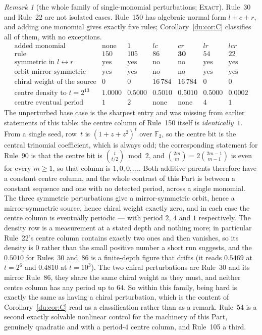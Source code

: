 \documentclass[11pt]{article}
\theoremstyle{definition}
\theoremstyle{remark}
\newtheorem{remark}[theorem]{Remark}
\newcommand{\F}{\mathbb{F}_2}
\newcommand{\EXACT}{\textsc{Exact}}
\begin{document}
\begin{remark}[the whole family of single-monomial perturbations; \EXACT]\label{du:family}
Rule~30 and Rule~22 are not isolated cases. Rule~150 has algebraic normal form $l+c+r$, and adding one
monomial gives exactly five rules; Corollary~\ref{du:cor:C} classifies all of them, with no exceptions.
\[
\begin{array}{lcccccc}
\text{added monomial} & \text{none} & 1 & lc & cr & lr & lcr\\
\text{rule} & 150 & 105 & 86 & \mathbf{30} & 54 & 22\\
\text{symmetric in } l\leftrightarrow r & \text{yes} & \text{yes} & \text{no} & \text{no} & \text{yes} & \text{yes}\\
\text{orbit mirror-symmetric} & \text{yes} & \text{yes} & \text{no} & \text{no} & \text{yes} & \text{yes}\\
\text{chiral weight of the source} & 0 & 0 & 16\,784 & 16\,784 & 0 & 0\\
\text{centre density to } t=2^{13} & 1.0000 & 0.5000 & 0.5010 & 0.5010 & 0.5000 & 0.0002\\
\text{centre eventual period} & 1 & 2 & \text{none} & \text{none} & 4 & 1
\end{array}
\]
The unperturbed base case is the sharpest entry and was missing from earlier statements of this table:
the centre column of Rule~150 itself is \emph{identically~$1$}. From a single seed, row~$t$ is
$(1+z+z^2)^t$ over $\F$, so the centre bit is the central trinomial coefficient, which is always odd;
the corresponding statement for Rule~90 is that the centre bit is $\binom{t}{t/2}\bmod2$, and
$\binom{2m}{m}=2\binom{2m-1}{m-1}$ is even for every $m\ge1$, so that column is $1,0,0,\dots$. Both
additive parents therefore have a constant centre column, and the whole contrast of this Part is
between a constant sequence and one with no detected period, across a single monomial.
The three symmetric perturbations give a mirror-symmetric orbit, hence a mirror-symmetric source, hence
chiral weight exactly zero, and in each case the centre column is eventually periodic --- with period
$2$, $4$ and $1$ respectively. The density row is a measurement at a stated depth and nothing more; in
particular Rule~22's centre column contains exactly two ones and then vanishes, so its density is $0$
rather than the small positive number a short run suggests, and the $0.5010$ for Rules~$30$ and~$86$
is a finite-depth figure that drifts (it reads $0.5469$ at $t=2^{6}$ and $0.4810$ at $t=10^{3}$). The two chiral perturbations are Rule~30 and its mirror Rule~86, they
share the same chiral weight as they must, and neither centre column has any period up to $64$. So
within this family, being hard is exactly the same as having a chiral perturbation, which is the content
of Corollary~\ref{du:cor:C} read as a classification rather than as a remark. Rule~54 is a second
exactly solvable nonlinear control for the machinery of this Part, genuinely quadratic and with a
period-$4$ centre column, and Rule~105 a third.
\end{remark}
\end{document}
